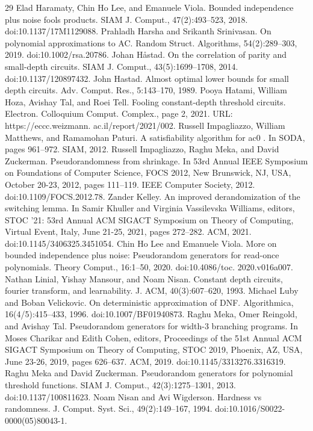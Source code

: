 \begin{thebibliography}{29}
 Elad Haramaty, Chin Ho Lee, and Emanuele Viola. Bounded independence plus noise fools products. SIAM J. Comput., 47(2):493–523, 2018. doi:10.1137/17M1129088.
 Prahladh Harsha and Srikanth Srinivasan. On polynomial approximations to AC. Random Struct. Algorithms, 54(2):289–303, 2019. doi:10.1002/rsa.20786.
 Johan Håstad. On the correlation of parity and small-depth circuits. SIAM J. Comput., 43(5):1699–1708, 2014. doi:10.1137/120897432.
 John Hastad. Almost optimal lower bounds for small depth circuits. Adv. Comput. Res., 5:143–170, 1989.
 Pooya Hatami, William Hoza, Avishay Tal, and Roei Tell. Fooling constant-depth threshold circuits. Electron. Colloquium Comput. Complex., page 2, 2021. URL: https://eccc.weizmann. ac.il/report/2021/002.
 Russell Impagliazzo, William Matthews, and Ramamohan Paturi. A satisfiability algorithm for ac0 . In SODA, pages 961–972. SIAM, 2012.
 Russell Impagliazzo, Raghu Meka, and David Zuckerman. Pseudorandomness from shrinkage. In 53rd Annual IEEE Symposium on Foundations of Computer Science, FOCS 2012, New Brunswick, NJ, USA, October 20-23, 2012, pages 111–119. IEEE Computer Society, 2012. doi:10.1109/FOCS.2012.78.
 Zander Kelley. An improved derandomization of the switching lemma. In Samir Khuller and Virginia Vassilevska Williams, editors, STOC ’21: 53rd Annual ACM SIGACT Symposium on Theory of Computing, Virtual Event, Italy, June 21-25, 2021, pages 272–282. ACM, 2021. doi:10.1145/3406325.3451054.
 Chin Ho Lee and Emanuele Viola. More on bounded independence plus noise: Pseudorandom generators for read-once polynomials. Theory Comput., 16:1–50, 2020. doi:10.4086/toc. 2020.v016a007.
 Nathan Linial, Yishay Mansour, and Noam Nisan. Constant depth circuits, fourier transform, and learnability. J. ACM, 40(3):607–620, 1993.
 Michael Luby and Boban Velickovic. On deterministic approximation of DNF. Algorithmica, 16(4/5):415–433, 1996. doi:10.1007/BF01940873.
 Raghu Meka, Omer Reingold, and Avishay Tal. Pseudorandom generators for width-3 branching programs. In Moses Charikar and Edith Cohen, editors, Proceedings of the 51st Annual ACM SIGACT Symposium on Theory of Computing, STOC 2019, Phoenix, AZ, USA, June 23-26, 2019, pages 626–637. ACM, 2019. doi:10.1145/3313276.3316319.
 Raghu Meka and David Zuckerman. Pseudorandom generators for polynomial threshold functions. SIAM J. Comput., 42(3):1275–1301, 2013. doi:10.1137/100811623.
 Noam Nisan and Avi Wigderson. Hardness vs randomness. J. Comput. Syst. Sci., 49(2):149–167, 1994. doi:10.1016/S0022-0000(05)80043-1.

\end{thebibliography}
